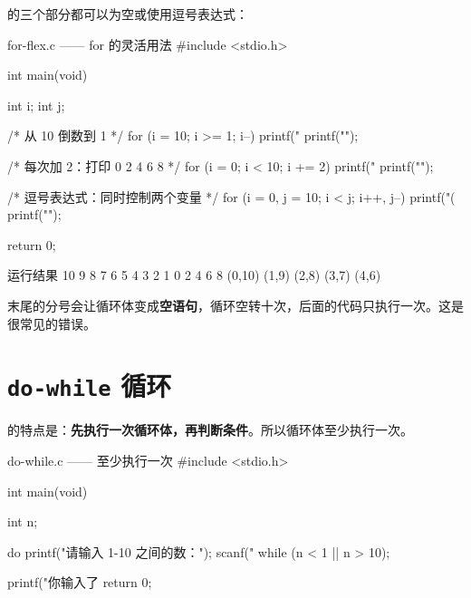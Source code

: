  的三个部分都可以为空或使用逗号表达式：

\begin{codebox}{for-flex.c —— for 的灵活用法}
#include <stdio.h>

int main(void)
{
    int i;
    int j;

    /* 从 10 倒数到 1 */
    for (i = 10; i >= 1; i--) {
        printf("%
    }
    printf("\n");

    /* 每次加 2：打印 0 2 4 6 8 */
    for (i = 0; i < 10; i += 2) {
        printf("%
    }
    printf("\n");

    /* 逗号表达式：同时控制两个变量 */
    for (i = 0, j = 10; i < j; i++, j--) {
        printf("(%
    }
    printf("\n");

    return 0;
}
\end{codebox}

\begin{outbox}{运行结果}
10 9 8 7 6 5 4 3 2 1 
0 2 4 6 8 
(0,10) (1,9) (2,8) (3,7) (4,6) 
\end{outbox}

\begin{pitfall}[分号陷阱]
 末尾的分号会让循环体变成\textbf{空语句}，循环空转十次，后面的代码只执行一次。这是很常见的错误。
\end{pitfall}

\section{\texttt{do-while} 循环}

 的特点是：\textbf{先执行一次循环体，再判断条件}。所以循环体至少执行一次。

\begin{center}
\end{center}

\begin{codebox}{do-while.c —— 至少执行一次}
#include <stdio.h>

int main(void)
{
    int n;

    do {
        printf("请输入 1-10 之间的数：");
        scanf("%
    } while (n < 1 || n > 10);

    printf("你输入了 %
    return 0;
}
\end{codebox}

